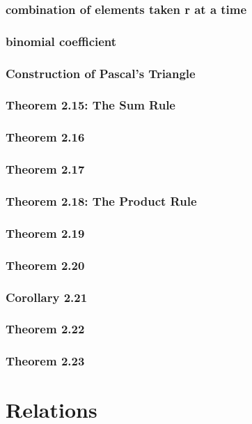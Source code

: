 \documentclass[a4paper]{article}
\begin{document}
\subsubsection*{combination of elements taken r at a time}
\subsubsection*{binomial coefficient}
\subsubsection*{Construction of Pascal's Triangle}
\subsubsection*{Theorem 2.15: The Sum Rule}
\subsubsection*{Theorem 2.16}
\subsubsection*{Theorem 2.17}
\subsubsection*{Theorem 2.18: The Product Rule}
\subsubsection*{Theorem 2.19}
\subsubsection*{Theorem 2.20}
\subsubsection*{Corollary 2.21}
\subsubsection*{Theorem 2.22}
\subsubsection*{Theorem 2.23}

\newpage
\section{Relations}   %
\end{document}
